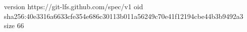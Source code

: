 version https://git-lfs.github.com/spec/v1
oid sha256:40e3316a6633cfe354e686c30113b011a56249c70e41f12194cbe44b3b9492a3
size 66
